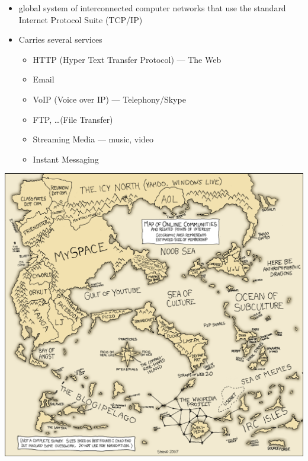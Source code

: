 \documentclass[a4paper,landscape,headrule,footrule,xetex]{foils}
\begin{document}
\begin{itemize}
\item global system of interconnected computer networks that use the standard Internet Protocol Suite (TCP/IP)
\item Carries several services
  \begin{itemize}
  \item HTTP (Hyper Text Transfer Protocol) --- The Web
  \item Email
  \item VoIP (Voice over IP) --- Telephony/Skype
  \item FTP, \ldots (File Transfer)
  \item Streaming Media --- music, video
  \item Instant Messaging
  \end{itemize}
\end{itemize}

\begin{center}
  \includegraphics[height=\textheight]{../pics/online_communities}
\end{center}
\end{document}
